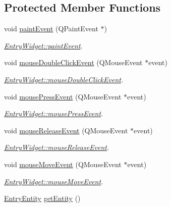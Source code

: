 \subsection*{Protected Member Functions}
\begin{DoxyCompactItemize}
\item 
void \hyperlink{class_entry_widget_ab5431cd34c9d54fd064306285db42742}{paint\+Event} (Q\+Paint\+Event $\ast$)
\begin{DoxyCompactList}\small\item\em \hyperlink{class_entry_widget_ab5431cd34c9d54fd064306285db42742}{Entry\+Widget\+::paint\+Event}. \end{DoxyCompactList}\item 
void \hyperlink{class_entry_widget_aa311dee3cdbc2bd21869b81cfa4c536a}{mouse\+Double\+Click\+Event} (Q\+Mouse\+Event $\ast$event)
\begin{DoxyCompactList}\small\item\em \hyperlink{class_entry_widget_aa311dee3cdbc2bd21869b81cfa4c536a}{Entry\+Widget\+::mouse\+Double\+Click\+Event}. \end{DoxyCompactList}\item 
void \hyperlink{class_entry_widget_acaf6010068ca200f9f1cb2691276440b}{mouse\+Press\+Event} (Q\+Mouse\+Event $\ast$event)
\begin{DoxyCompactList}\small\item\em \hyperlink{class_entry_widget_acaf6010068ca200f9f1cb2691276440b}{Entry\+Widget\+::mouse\+Press\+Event}. \end{DoxyCompactList}\item 
void \hyperlink{class_entry_widget_af35e51100ac3044f4bd1e8527676dec6}{mouse\+Release\+Event} (Q\+Mouse\+Event $\ast$event)
\begin{DoxyCompactList}\small\item\em \hyperlink{class_entry_widget_af35e51100ac3044f4bd1e8527676dec6}{Entry\+Widget\+::mouse\+Release\+Event}. \end{DoxyCompactList}\item 
void \hyperlink{class_entry_widget_ad77abb05a26b5af7eeb54773690f31c1}{mouse\+Move\+Event} (Q\+Mouse\+Event $\ast$event)
\begin{DoxyCompactList}\small\item\em \hyperlink{class_entry_widget_ad77abb05a26b5af7eeb54773690f31c1}{Entry\+Widget\+::mouse\+Move\+Event}. \end{DoxyCompactList}\item 
\hyperlink{class_entry_entity}{Entry\+Entity} \hyperlink{class_entry_widget_aceac3096d3d475baa5cee08a1031d535}{get\+Entity} ()

\end{DoxyCompactItemize}
